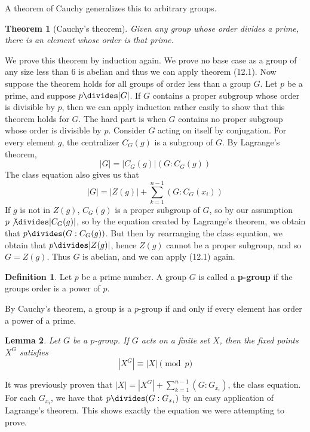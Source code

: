 \documentclass[12pt]{amsbook}
\makeatletter
\theoremstyle{plain}
\newtheorem{theorem}{Theorem}[chapter]
\newtheorem{lemma}[theorem]{Lemma}
\theoremstyle{definition}
\newtheorem{definition}{Definition}
\renewenvironment{proof}[1][\proofname]{\par
  \pushQED{\qed}%
  \normalfont \topsep6\p@\@plus6\p@\relax
  \list{}{\leftmargin=0em
          \rightmargin=\leftmargin
          \settowidth{\itemindent}{\itshape#1}%
          \labelwidth=\itemindent}

  \item[\hskip\labelsep
        \itshape
    #1\@addpunct{.}]\ignorespaces
}{%
  \popQED\endlist\@endpefalse
}
\makeatother
\begin{document}
A theorem of Cauchy generalizes this to arbitrary groups.

\begin{theorem}[Cauchy's theorem] 
    Given any group whose order divides a prime, there is an element whose order is that prime.
\end{theorem}
\begin{proof}
    We prove this theorem by induction again. We prove no base case as a group of any size less than 6 is abelian and thus we can apply theorem (12.1). Now suppose the theorem holds for all groups of order less than a group $G$. Let $p$ be a prime, and suppose $p \divides |G|$. If $G$ contains a proper subgroup whose order is divisible by $p$, then we can apply induction rather easily to show that this theorem holds for $G$. The hard part is when $G$ contains no proper subgroup whose order is divisible by $p$. Consider $G$ acting on itself by conjugation. For every element $g$, the centralizer $C_G(g)$ is a subgroup of $G$. By Lagrange's theorem,
    \[ |G| = |C_G(g)|(G:C_G(g)) \]
    The class equation also gives us that
    \[ |G| = |Z(g)| + \sum_{k = 1}^{n-1} (G:C_G(x_i)) \]
    If $g$ is not in $Z(g)$, $C_G(g)$ is a proper subgroup of $G$, so by our assumption $p \not \divides |C_G(g)|$, so by the equation created by Lagrange's theorem, we obtain that $p \divides (G:C_G(g))$. But then by rearranging the class equation, we obtain that $p \divides |Z(g)|$, hence $Z(g)$ cannot be a proper subgroup, and so $G = Z(g)$. Thus $G$ is abelian, and we can apply (12.1) again.
\end{proof}

\begin{definition}
    Let $p$ be a prime number. A group $G$ is called a {\bf p-group}  if the groups order is a power of $p$.
\end{definition}

By Cauchy's theorem, a group is a $p$-group if and only if every element has order a power of a prime.

\begin{lemma}
    Let $G$ be a $p$-group. If $G$ acts on a finite set $X$, then the fixed points $X^G$ satisfies
    \[ |X^G| \equiv |X| \pmod{p} \]
\end{lemma}
\begin{proof}
    It was previously proven that $|X| = |X^G| + \sum_{k=1}^{n-1} (G:G_{x_i})$, the class equation. For each $G_{x_i}$, we have that $p \divides (G:G_{x_i})$ by an easy application of Lagrange's theorem. This shows exactly the equation we were attempting to prove.
\end{proof}
\end{document}
